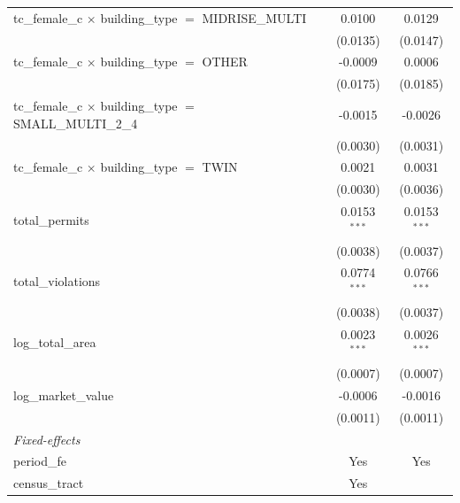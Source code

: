 \begin{tabular}{lcc}
   tc\_female\_c $\times$ building\_type $=$ MIDRISE\_MULTI            & 0.0100         & 0.0129\\   
                                                                       & (0.0135)       & (0.0147)\\   
   tc\_female\_c $\times$ building\_type $=$ OTHER                     & -0.0009        & 0.0006\\   
                                                                       & (0.0175)       & (0.0185)\\   
   tc\_female\_c $\times$ building\_type $=$ SMALL\_MULTI\_2\_4        & -0.0015        & -0.0026\\   
                                                                       & (0.0030)       & (0.0031)\\   
   tc\_female\_c $\times$ building\_type $=$ TWIN                      & 0.0021         & 0.0031\\   
                                                                       & (0.0030)       & (0.0036)\\   
   total\_permits                                                      & 0.0153$^{***}$ & 0.0153$^{***}$\\   
                                                                       & (0.0038)       & (0.0037)\\   
   total\_violations                                                   & 0.0774$^{***}$ & 0.0766$^{***}$\\   
                                                                       & (0.0038)       & (0.0037)\\   
   log\_total\_area                                                    & 0.0023$^{***}$ & 0.0026$^{***}$\\   
                                                                       & (0.0007)       & (0.0007)\\   
   log\_market\_value                                                  & -0.0006        & -0.0016\\   
                                                                       & (0.0011)       & (0.0011)\\   
   \midrule
   \emph{Fixed-effects}\\
   period\_fe                                                          & Yes            & Yes\\  
   census\_tract                                                       & Yes            & \\  

\end{tabular}
